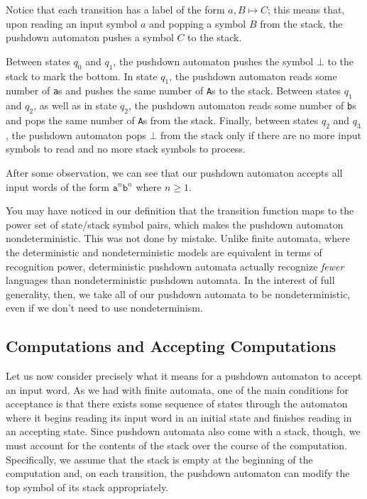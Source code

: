 \begin{example}
\begin{center}
\end{center}
Notice that each transition has a label of the form $a, B \mapsto C$; this means that, upon reading an input symbol $a$ and popping a symbol $B$ from the stack, the pushdown automaton pushes a symbol $C$ to the stack.

Between states $q_{0}$ and $q_{1}$, the pushdown automaton pushes the symbol $\bot$ to the stack to mark the bottom. In state $q_{1}$, the pushdown automaton reads some number of \texttt{a}s and pushes the same number of \texttt{A}s to the stack. Between states $q_{1}$ and $q_{2}$, as well as in state $q_{2}$, the pushdown automaton reads some number of \texttt{b}s and pops the same number of \texttt{A}s from the stack. Finally, between states $q_{2}$ and $q_{3}$, the pushdown automaton pops $\bot$ from the stack only if there are no more input symbols to read and no more stack symbols to process.

After some observation, we can see that our pushdown automaton accepts all input words of the form $\texttt{a}^{n}\texttt{b}^{n}$ where $n \geq 1$.
\end{example}

You may have noticed in our definition that the transition function maps to the power set of state/stack symbol pairs, which makes the pushdown automaton nondeterministic. This was not done by mistake. Unlike finite automata, where the deterministic and nondeterministic models are equivalent in terms of recognition power, deterministic pushdown automata actually recognize \emph{fewer} languages than nondeterministic pushdown automata. In the interest of full generality, then, we take all of our pushdown automata to be nondeterministic, even if we don't need to use nondeterminism.

\subsection{Computations and Accepting Computations}

Let us now consider precisely what it means for a pushdown automaton to accept an input word. As we had with finite automata, one of the main conditions for acceptance is that there exists some sequence of states through the automaton where it begins reading its input word in an initial state and finishes reading in an accepting state. Since pushdown automata also come with a stack, though, we must account for the contents of the stack over the course of the computation. Specifically, we assume that the stack is empty at the beginning of the computation and, on each transition, the pushdown automaton can modify the top symbol of its stack appropriately.

